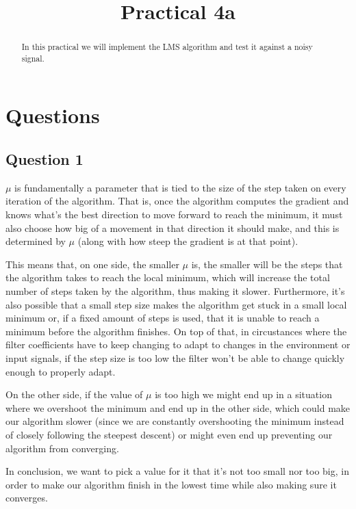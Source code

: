 \documentclass[conference,9pt]{IEEEtran}
\begin{document}
\title{Practical 4a}

\author{
}

\maketitle
\begin{abstract}
In this practical we will implement the LMS algorithm and test it against a noisy signal.
\end{abstract}

\section{Questions}

\subsection{Question 1}
$\mu$ is fundamentally a parameter that is tied to the size of the step taken on every iteration of the algorithm. That is, once the algorithm computes the gradient and knows what's the best direction to move forward to reach the minimum, it must also choose how big of a movement in that direction it should make, and this is determined by $\mu$ (along with how steep the gradient is at that point).

This means that, on one side, the smaller $\mu$ is, the smaller will be the steps that the algorithm takes to reach the local minimum, which will increase the total number of steps taken by the algorithm, thus making it slower. Furthermore, it's also possible that a small step size makes the algorithm get stuck in a small local minimum or, if a fixed amount of steps is used, that it is unable to reach a minimum before the algorithm finishes. On top of that, in circustances where the filter coefficients have to keep changing to adapt to changes in the environment or input signals, if the step size is too low the filter won't be able to change quickly enough to properly adapt.

On the other side, if the value of $\mu$ is too high we might end up in a situation where we overshoot the minimum and end up in the other side, which could make our algorithm slower (since we are constantly overshooting the minimum instead of closely following the steepest descent) or might even end up preventing our algorithm from converging.

In conclusion, we want to pick a value for it that it's not too small nor too big, in order to make our algorithm finish in the lowest time while also making sure it converges.
\end{document}
